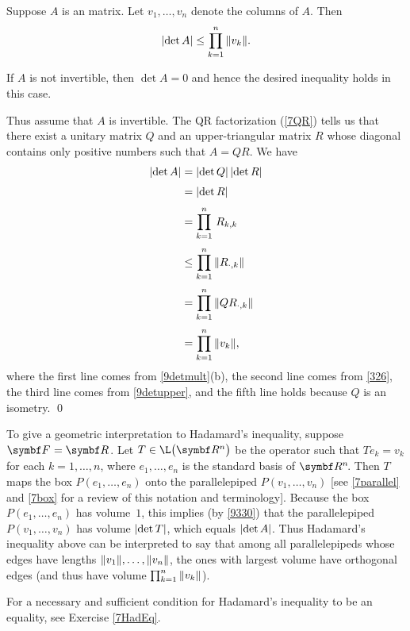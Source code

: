 {Suppose $A$ is an  matrix. Let $v_1, \ldots, v_n$ denote the columns of $A$. Then
\vspace{-.04in} %
\[
\lvert \det A \rvert \le \prod_{k=1}^n \, \lVert v_k \rVert.
\]}

\proof
If $A$ is not invertible, then $\det A = 0$ and hence the desired inequality holds in this case.

Thus assume that $A$ is invertible. The QR factorization (\ref{7QR}) tells us that there exist a unitary matrix $Q$ and an upper-triangular matrix $R$ whose diagonal contains only positive numbers such that $A = QR$. We have
\begin{align*}
\lvert \det A\rvert &= \lvert \det Q \rvert \, \lvert\det R\rvert \\[3bp]
&= \lvert \det R \rvert \\[3bp]
&= \prod_{k=1}^n \,  R_{k,k} \\[3bp]
&\le \prod_{k=1}^n \, \lVert R_{\cdot, k} \rVert \\[3bp]
&= \prod_{k=1}^n \, \lVert QR_{\cdot, k} \rVert \\[3bp]
&= \prod_{k=1}^n \, \lVert v_k\rVert,
\end{align*}
where the first line comes from \ref{9detmult}(b), the second line comes from \ref{326}, the third line comes from \ref{9detupper}, and the fifth line holds because $Q$ is an isometry.
\qed

To give a geometric interpretation to Hadamard's inequality, suppose \mbox{$\F{} = \R{}$}. Let $T \in \L\paren[\big]{\R n}$ be the operator such that $Te_k = v_k$ for each $k=1, \ldots, n$, where $e_1, \ldots, e_n$ is the standard basis of $\RR n$. Then $T$ maps the box $P(e_1, \ldots, e_n)$ onto the parallelepiped $P(v_1, \ldots, v_n)$ [see \ref{7parallel} and \ref{7box} for a review of this notation and terminology]. Because the box $P(e_1, \ldots, e_n)$ has volume~$1$, this implies (by \ref{9330}) that the parallelepiped $P(v_1, \ldots, v_n)$ has volume $\lvert\det T\rvert$, which equals $\lvert\det A\rvert$. Thus Hadamard's inequality above can be interpreted to say that among all parallelepipeds whose edges have lengths $\lVert v_1\rVert, \ldots, \lVert v_n\rVert$, the ones with largest volume have orthogonal edges \Big(and thus have volume $ \prod_{k=1}^n \, \lVert v_k \rVert$\Big).

For a necessary and sufficient condition for Hadamard's inequality to be an equality, see Exercise \ref{7HadEq}.

